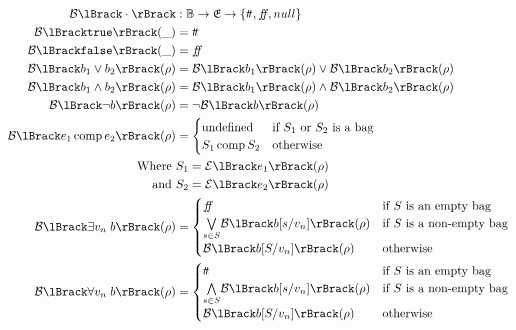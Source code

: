 \begin{align}
    \boolsem{\cdot} &: \mathbb{B} \rightarrow \environments \rightarrow \{\true, \false, \mnull\} \\
    \boolsem{\texttt{true}}(\_) &= \true \\
    \boolsem{\texttt{false}}(\_) &= \false \\
    \boolsem{b_1 \lor b_2}(\environment) &= \boolsem{b_1}(\environment) \lor \boolsem{b_2}(\environment) \\
    \boolsem{b_1 \land b_2}(\environment) &= \boolsem{b_1}(\environment) \land \boolsem{b_2}(\environment) \\
    \boolsem{\neg b}(\environment) &= \neg \boolsem{b}(\environment) \\
    \boolsem{e_1 \compareoperator e_2}(\environment) &=
    \begin{cases}
        \text{undefined} & \text{if } S_1 \text{ or } S_2 \text{ is a bag} \\
        S_1 \compareoperator S_2 & \text{otherwise }
    \end{cases} \\
    \text{Where }& S_1 = \expsem{e_1}(\environment) \\
    \text{and }& S_2 = \expsem{e_2}(\environment) \\
    \boolsem{\exists v_n \; b}(\environment) &= \begin{cases}
        \false & \text{if $S$ is an empty bag} \\
        \underset{s \in S}{\bigvee}\boolsem{b[s/v_n]}(\environment) & \text{if $S$ is a non-empty bag} \\
        \boolsem{b[S/v_n]}(\environment) & \text{otherwise} \\
    \end{cases} \\
    \boolsem{\forall v_n \; b}(\environment) &= \begin{cases}
        \true & \text{if $S$ is an empty bag} \\
        \underset{s \in S}{\bigwedge}\boolsem{b[s/v_n]}(\environment) & \text{if $S$ is a non-empty bag} \\
        \boolsem{b[S/v_n]}(\environment) & \text{otherwise} \\
    \end{cases} \\
\end{align}

